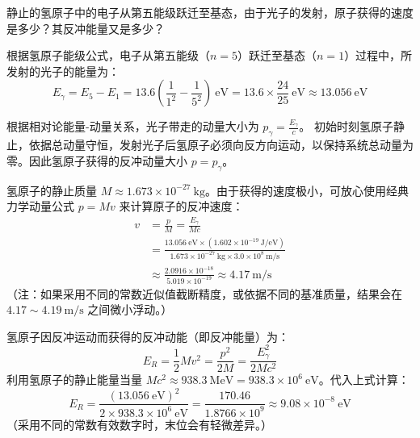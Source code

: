 \begin{exercise}\label{ex:22.13}
静止的氢原子中的电子从第五能级跃迁至基态，由于光子的发射，原子获得的速度是多少？其反冲能量又是多少？
\end{exercise}
\begin{solution}
根据氢原子能级公式，电子从第五能级（$n = 5$）跃迁至基态（$n = 1$）过程中，所发射的光子的能量为：
$$ E_\gamma = E_5 - E_1 = 13.6 \left( \frac{1}{1^2} - \frac{1}{5^2} \right) \ \mathrm{eV} = 13.6 \times \frac{24}{25} \ \mathrm{eV} \approx 13.056 \ \mathrm{eV} $$

根据相对论能量-动量关系，光子带走的动量大小为 $p_\gamma = \frac{E_\gamma}{c}$。
初始时刻氢原子静止，依据总动量守恒，发射光子后氢原子必须向反方向运动，以保持系统总动量为零。因此氢原子获得的反冲动量大小 $p = p_\gamma$。

氢原子的静止质量 $M \approx 1.673 \times 10^{-27} \ \mathrm{kg}$。由于获得的速度极小，可放心使用经典力学动量公式 $p = M v$ 来计算原子的反冲速度：
\begin{align*}
    v &= \frac{p}{M} = \frac{E_\gamma}{M c} \\
      &= \frac{13.056 \ \mathrm{eV} \times (1.602 \times 10^{-19} \ \mathrm{J/eV})}{1.673 \times 10^{-27} \ \mathrm{kg} \times 3.0 \times 10^8 \ \mathrm{m/s}} \\
      &\approx \frac{2.0916 \times 10^{-18}}{5.019 \times 10^{-19}} \approx 4.17 \ \mathrm{m/s}
\end{align*}
（注：如果采用不同的常数近似值截断精度，或依据不同的基准质量，结果会在 $4.17 \sim 4.19 \ \mathrm{m/s}$ 之间微小浮动。）

氢原子因反冲运动而获得的反冲动能（即反冲能量）为：
$$ E_R = \frac{1}{2} M v^2 = \frac{p^2}{2M} = \frac{E_\gamma^2}{2 M c^2} $$
利用氢原子的静止能量当量 $Mc^2 \approx 938.3 \ \mathrm{MeV} = 938.3 \times 10^6 \ \mathrm{eV}$。代入上式计算：
$$ E_R = \frac{(13.056 \ \mathrm{eV})^2}{2 \times 938.3 \times 10^6 \ \mathrm{eV}} = \frac{170.46}{1.8766 \times 10^9} \approx 9.08 \times 10^{-8} \ \mathrm{eV} $$
（采用不同的常数有效数字时，末位会有轻微差异。）
\end{solution}

